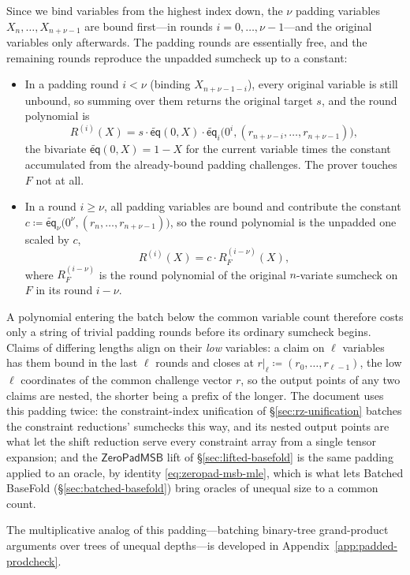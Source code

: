 \documentclass{article}
\theoremstyle{definition}
\newcommand*{\mle}{\widetilde}
\newcommand{\eq}{\mathsf{eq}}
\begin{document}
Since we bind variables from the highest index down, the $\nu$ padding variables $X_n, \ldots, X_{n + \nu - 1}$ are bound first---in rounds $i = 0, \ldots, \nu - 1$---and the original variables only afterwards. The padding rounds are essentially free, and the remaining rounds reproduce the unpadded sumcheck up to a constant:
\begin{itemize}
\item In a padding round $i < \nu$ (binding $X_{n + \nu - 1 - i}$), every original variable is still unbound, so summing over them returns the original target $s$, and the round polynomial is
\[
  R^{(i)}(X) = s \cdot \mle{\eq}(0, X) \cdot \mle{\eq}_i\bigl( 0^i, (r_{n + \nu - i}, \ldots, r_{n + \nu - 1}) \bigr),
\]
the bivariate $\mle{\eq}(0, X) = 1 - X$ for the current variable times the constant accumulated from the already-bound padding challenges. The prover touches $F$ not at all.
\item In a round $i \ge \nu$, all padding variables are bound and contribute the constant $c \coloneqq \mle{\eq}_\nu\bigl( 0^\nu, (r_n, \ldots, r_{n + \nu - 1}) \bigr)$, so the round polynomial is the unpadded one scaled by $c$,
\[
  R^{(i)}(X) = c \cdot R_F^{(i - \nu)}(X),
\]
where $R_F^{(i - \nu)}$ is the round polynomial of the original $n$-variate sumcheck on $F$ in its round $i - \nu$.
\end{itemize}
A polynomial entering the batch below the common variable count therefore costs only a string of trivial padding rounds before its ordinary sumcheck begins. Claims of differing lengths align on their \emph{low} variables: a claim on $\ell$ variables has them bound in the last $\ell$ rounds and closes at $r|_\ell \coloneqq (r_0, \ldots, r_{\ell - 1})$, the low $\ell$ coordinates of the common challenge vector $r$, so the output points of any two claims are nested, the shorter being a prefix of the longer. The document uses this padding twice: the constraint-index unification of \S\ref{sec:rz-unification} batches the constraint reductions' sumchecks this way, and its nested output points are what let the shift reduction serve every constraint array from a single tensor expansion; and the $\textsf{ZeroPadMSB}$ lift of \S\ref{sec:lifted-basefold} is the same padding applied to an oracle, by identity \eqref{eq:zeropad-msb-mle}, which is what lets Batched BaseFold (\S\ref{sec:batched-basefold}) bring oracles of unequal size to a common count.

The multiplicative analog of this padding---batching binary-tree grand-product arguments over trees of unequal depths---is developed in Appendix~\ref{app:padded-prodcheck}.
\end{document}
